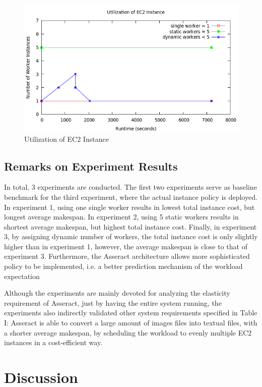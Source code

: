 \documentclass[conference]{IEEEtran}
\begin{document}
\begin{figure}[H]
\centering
        \includegraphics[totalheight=6cm,width=\linewidth]{instanceusage.png}
    \caption{Utilization of EC2 Instance}
    \label{fig:instanceusage}
\end{figure}

\subsection{Remarks on Experiment Results}\label{sec:experimentremark}
In total, 3 experiments are conducted. The first two experiments serve as baseline benchmark for the third experiment, where the actual instance policy is deployed.  In experiment 1, using one single worker results in lowest total instance cost, but longest average makespan. In experiment 2, using 5 static workers results in shortest average makespan, but highest total instance cost. Finally, in experiment 3, by assigning dynamic number of workers, the total instance cost is only slightly higher than in experiment 1, however, the average makespan is close to that of experiment 3. Furthermore, the Asseract architecture allows more sophisticated policy to be implemented, i.e. a better prediction mechanism of the workload expectation 

Although the experiments are mainly devoted for analyzing the elasticity requirement of Asseract, just by having the entire system running, the experiments also indirectly validated other system requirements specified in Table I: Asseract is able to convert a large amount of images files into textual files, with a shorter average makespan, by scheduling the workload to evenly multiple EC2 instances in a cost-efficient way.

\section{Discussion}\label{sec:discussion}
\end{document}
